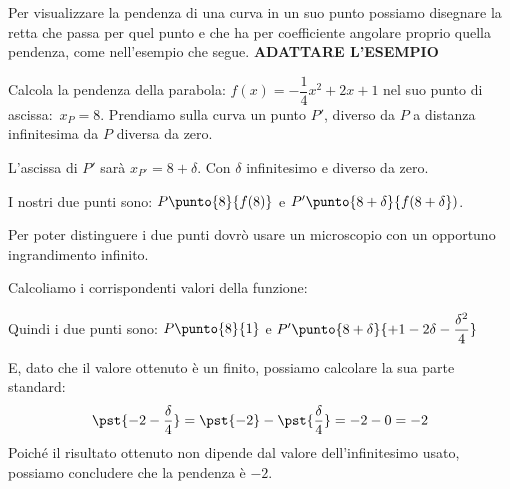 Per visualizzare la pendenza di una curva in un suo punto 
possiamo disegnare la retta che passa per quel punto e che ha per coefficiente 
angolare proprio quella pendenza, come nell'esempio che segue.
\textbf{ADATTARE L'ESEMPIO}
\begin{esempio}
Calcola la pendenza della parabola:
\(f(x) = -\dfrac{1}{4}x^2+2x +1\) \quad nel suo punto di ascissa:~\(x_P=8\).
Prendiamo sulla curva un punto \(P'\), diverso da \(P\) a 
distanza infinitesima da \(P\) diversa da zero.

L'ascissa di \(P'\) sarà \(x_{P'}=8+\delta\). 
Con \(\delta\) infinitesimo e diverso da zero.

I nostri due punti sono:
\(P\punto{8}{f(8)}\) e \(P'\punto{8+\delta}{f(8+\delta})\).

Per poter distinguere i due punti dovrò usare un microscopio con un 
opportuno ingrandimento infinito.

Calcoliamo i corrispondenti valori della funzione:


Quindi i due punti sono:
\(P\punto{8}{1}\) e 
\(P'\punto{8+\delta}{+1 - 2\delta -\dfrac{\delta^2}{4}}\)


E, dato che il valore ottenuto è un finito, possiamo calcolare la sua parte 
standard:
\[\pst{-2-\dfrac{\delta}{4}} = \pst{-2}-\pst{\dfrac{\delta}{4}} =
  -2 - 0 = -2\]
Poiché il risultato ottenuto non dipende dal valore dell'infinitesimo 
usato, possiamo concludere che la pendenza è \(-2\).
\end{esempio}



